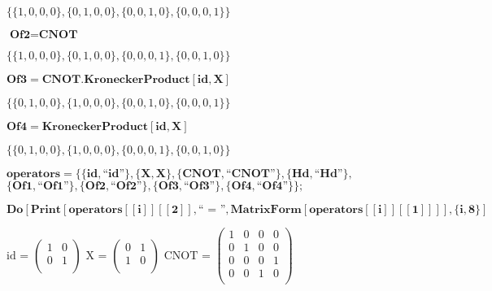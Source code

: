 \begin{doublespace}
    \noindent\(\{\{1,0,0,0\},\{0,1,0,0\},\{0,0,1,0\},\{0,0,0,1\}\}\)
\end{doublespace}

\begin{doublespace}
    \noindent\(\pmb{\text{Of2} = \text{CNOT}}\)
\end{doublespace}

\begin{doublespace}
    \noindent\(\{\{1,0,0,0\},\{0,1,0,0\},\{0,0,0,1\},\{0,0,1,0\}\}\)
\end{doublespace}

\begin{doublespace}
    \noindent\(\pmb{\text{Of3} = \text{CNOT}.\text{KroneckerProduct}[\text{id}, X]}\)
\end{doublespace}

\begin{doublespace}
    \noindent\(\{\{0,1,0,0\},\{1,0,0,0\},\{0,0,1,0\},\{0,0,0,1\}\}\)
\end{doublespace}

\begin{doublespace}
    \noindent\(\pmb{\text{Of4} = \text{KroneckerProduct}[\text{id}, X]}\)
\end{doublespace}

\begin{doublespace}
    \noindent\(\{\{0,1,0,0\},\{1,0,0,0\},\{0,0,0,1\},\{0,0,1,0\}\}\)
\end{doublespace}

\begin{doublespace}
    \noindent\(\pmb{\text{operators} = \{\{\text{id}, \text{{``}id{''}}\}, \{X, \text{X}\}, \{\text{CNOT}, \text{{``}CNOT{''}}\}, \{\text{Hd}, \text{{``}Hd{''}}\},}\)\\
    \noindent\(\pmb{\{\text{Of1}, \text{{``}Of1{''}}\}, \{\text{Of2}, \text{{``}Of2{''}}\}, \{\text{Of3}, \text{{``}Of3{''}}\}, \{\text{Of4}, \text{{``}Of4{''}}\}\};}\)
\end{doublespace}
\begin{doublespace}
    \noindent\(\pmb{\text{Do}[\text{Print}[\text{operators}[[i]][[2]], \text{{``} = {''}}, \text{MatrixForm}[\text{operators}[[i]][[1]]]], \{i, 8\}]}\)
\end{doublespace}
\noindent\(\text{id}\text{ = }\left(
\begin{array}{cc}
    1 & 0 \\
    0 & 1 \\
\end{array}
\right)\)
\noindent\(\text{X}\text{ = }\left(
\begin{array}{cc}
    0 & 1 \\
    1 & 0 \\
\end{array}
\right)\)
\noindent\(\text{CNOT}\text{ = }\left(
\begin{array}{cccc}
    1 & 0 & 0 & 0 \\
    0 & 1 & 0 & 0 \\
    0 & 0 & 0 & 1 \\
    0 & 0 & 1 & 0 \\
\end{array}
\right)\)

